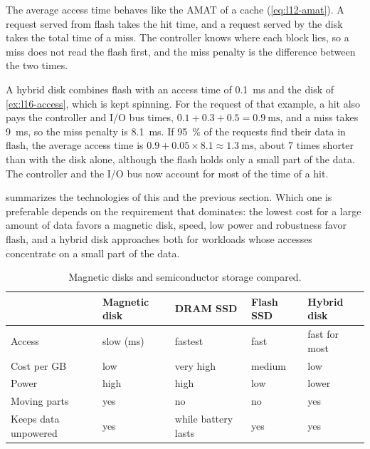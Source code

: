 \documentclass[../main.tex]{subfiles}
\begin{document}
The average access time behaves like the AMAT of a cache
(\cref{eq:l12-amat}).  A request served from flash takes the hit time, and a
request served by the disk takes the total time of a miss.  The controller
knows where each block lies, so a miss does not read the flash first, and the
miss penalty is the difference between the two times.

\begin{example}
  \label{ex:l16-hybrid}
  A hybrid disk combines flash with an access time of
  \SI{0.1}{\milli\second} and the disk of \cref{ex:l16-access}, which is kept
  spinning.  For the request of that example, a hit also pays the controller
  and I/O bus times, $0.1 + 0.3 + 0.5 = \SI{0.9}{\milli\second}$, and a miss
  takes \SI{9}{\milli\second}, so the miss penalty is
  \SI{8.1}{\milli\second}.  If \SI{95}{\percent} of the requests find their
  data in flash, the average access time is $0.9 + 0.05 \times 8.1 \approx
  \SI{1.3}{\milli\second}$, about 7 times shorter than with the disk alone,
  although the flash holds only a small part of the data.  The controller and
  the I/O bus now account for most of the time of a hit.
\end{example}

 summarizes the technologies of this and the previous
section.  Which one is preferable depends on the requirement that dominates:
the lowest cost for a large amount of data favors a magnetic disk, speed,
low power and robustness favor flash, and a hybrid disk approaches both for
workloads whose accesses concentrate on a small part of the data.

\begin{table}[htbp]
  \centering\small
  \caption{Magnetic disks and semiconductor storage compared.}
  \label{tab:l16-compare}
  \begin{tabular}{@{}lllll@{}}
    \toprule
                        & Magnetic disk & DRAM SSD     & Flash SSD & Hybrid disk \\
    \midrule
    Access              & slow (ms)     & fastest      & fast      & fast for most \\
    Cost per GB         & low           & very high    & medium    & low \\
    Power               & high          & high         & low       & lower \\
    Moving parts        & yes           & no           & no        & yes \\
    Keeps data unpowered & yes          & while battery lasts & yes & yes \\
    \bottomrule
  \end{tabular}
\end{table}
\end{document}
